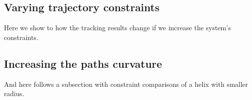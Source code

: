 \subsection{Varying trajectory constraints}
\label{sub:app_varying_sys_constraints}
Here we show to how the tracking results change if we increase the system's constraints.

\subsection{Increasing the paths curvature}
\label{sub:app_increasing_curvature}
And here follows a subsection with constraint comparisons of a helix with smaller radius.





